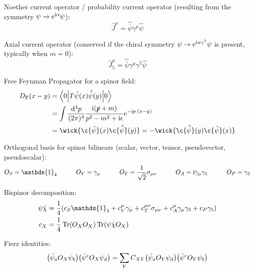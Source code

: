 			\noindent
			Noether current operator / probability current operator (resulting from the symmetry $\psi \to \mathrm{e}^{\mathrm{i} \alpha} \psi$):
			\begin{equation}
				\hat{J}^\mu = \hat{\bar{\psi}} \gamma^\mu \hat{\psi}
			\end{equation}

			\noindent
			Axial current operator (conserved if the chiral symmetry $\psi \to \mathrm{e}^{\mathrm{i} \alpha \gamma^5} \psi$ is present, typically when $m=0$):
			\begin{equation}
				\hat{J}^\mu_5 = \hat{\bar{\psi}} \gamma^\mu \gamma^5 \hat{\psi}
			\end{equation}

			\noindent
			Free Feynman Propagator for a spinor field:
			\begin{equation}
				\begin{aligned}
					D_\text{F}(x-y) &= \mel**{0}{T\hat{\psi}(x)\hat{\bar\psi}(y)}{0} \\
					&= \int \frac{\dd^4 p}{(2\pi)^4} \frac{\i(\slashed{p}+m)}{p^2-m^2+\i\epsilon} \ex^{-\i p\cdot(x-y)} \\
					&= \wick{\c{\hat{\psi}}(x) \c{\hat{\bar{\psi}}}(y)} = - \wick{\c{\hat{\bar{\psi}}}(y) \c{\hat\psi}(x)}
				\end{aligned}
			\end{equation}

			\noindent
			Orthogonal basis for spinor bilinears (scalar, vector, tensor, pseudovector, pseudoscalar):
			\begin{equation}
				O_S = \mathds{1}_4
				\hsp
				O_V = \gamma_\mu
				\hsp
				O_T = \frac{1}{\sqrt{2}} \sigma_{\mu\nu}
				\hsp
				O_A = \i \gamma_\mu \gamma_5
				\hsp
				O_P = \gamma_5
			\end{equation}

			\noindent
			Bispinor decomposition:
			\begin{align}
				\psi\bar{\chi} &= \frac{1}{4} \qty( c_S \mathds{1}_4 + c_V^\mu \gamma_\mu + c_T^{\mu\nu} \sigma_{\mu\nu} + c_A^\mu \gamma_\mu \gamma_5 + c_P \gamma_5 ) \\
				c_X &= \frac{1}{4} \tr(O_X O_X) \tr(\psi \bar{\chi} O_X)
			\end{align}

			\noindent
			Fierz identities:
			\begin{equation}
				\qty(\bar{\psi}_a O_X \psi_b) \qty(\bar{\psi}^c O_X \psi_d)
				= \sum_Y C_{XY} \qty(\bar{\psi}_a O_Y \psi_d) \qty(\bar{\psi}^c O_Y \psi_b)
			\end{equation}

